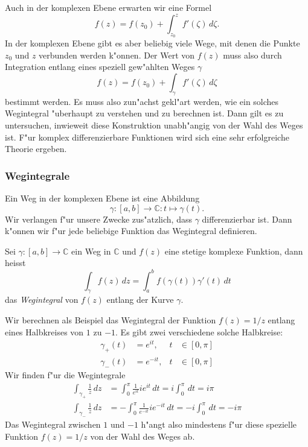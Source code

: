 Auch in der komplexen Ebene erwarten wir eine Formel
\[
f(z) = f(z_0) + \int_{z_0}^z f'(\zeta)\,d\zeta.
\]
In der komplexen Ebene gibt es aber beliebig viele Wege, mit denen die
Punkte $z_0$ und $z$ verbunden werden k"onnen. 
Der Wert von $f(z)$ muss also durch Integration entlang eines speziell
gew"ahlten Weges $\gamma$
\[
f(z) = f(z_0) + \int_{\gamma} f'(\zeta)\,d\zeta
\]
bestimmt werden.
Es muss also zun"achst gekl"art werden, wie ein solches Wegintegral
"uberhaupt zu verstehen und zu berechnen ist.
Dann gilt es zu untersuchen, inwieweit diese Konstruktion unabh"angig
von der Wahl des Weges ist.
F"ur komplex differenzierbare Funktionen wird sich eine sehr erfolgreiche
Theorie ergeben.


\subsubsection{Wegintegrale}
Ein Weg in der komplexen Ebene ist eine Abbildung 
\[
\gamma\colon [a,b]\to\mathbb C: t\mapsto \gamma(t).
\]
Wir verlangen f"ur unsere Zwecke zus"atzlich, dass $\gamma$ differenzierbar
ist.
Dann k"onnen wir f"ur jede beliebige Funktion das Wegintegral definieren.

\begin{definition}
Sei $\gamma\colon[a,b]\to\mathbb C$ ein Weg in $\mathbb C$ und $f(z)$
eine stetige komplexe Funktion, dann heisst
\[
\int_{\gamma} f(z)\,dz = \int_a^bf(\gamma(t)) \gamma'(t)\,dt
\]
das {\em Wegintegral} von $f(z)$ entlang der Kurve $\gamma$.
\end{definition}

\begin{beispiel}
Wir berechnen als Beispiel das Wegintegral der Funktion $f(z)=1/z$ entlang
eines Halbkreises von $1$ zu $-1$. 
Es gibt zwei verschiedene solche Halbkreise:
\begin{equation*}
\begin{aligned}
\gamma_+(t)&=e^{it},&t&\in[0,\pi]
\\
\gamma_-(t)&=e^{-it},&t&\in[0,\pi]
\end{aligned}
\end{equation*}
Wir finden f"ur die Wegintegrale
\begin{align*}
\int_{\gamma_+}\frac1z\,dz
&=
\int_0^\pi \frac1{e^{it}}ie^{it}\,dt=i\int_0^\pi\,dt=i\pi
\\
\int_{\gamma_-}\frac1z\,dz
&=
-\int_0^\pi \frac1{e^{-it}}ie^{-it}\,dt=-i\int_0^\pi\,dt=-i\pi
\end{align*}
Das Wegintegral zwischen $1$ und $-1$ h"angt also mindestens f"ur diese
spezielle Funktion $f(z)=1/z$ von der Wahl des Weges ab.
\end{beispiel}

